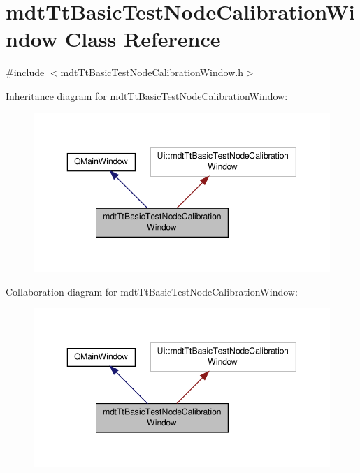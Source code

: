 \hypertarget{classmdt_tt_basic_test_node_calibration_window}{\section{mdt\-Tt\-Basic\-Test\-Node\-Calibration\-Window Class Reference}
\label{classmdt_tt_basic_test_node_calibration_window}
}


{\ttfamily \#include $<$mdt\-Tt\-Basic\-Test\-Node\-Calibration\-Window.\-h$>$}



Inheritance diagram for mdt\-Tt\-Basic\-Test\-Node\-Calibration\-Window\-:\nopagebreak
\begin{figure}[H]
\begin{center}
\leavevmode
\includegraphics[width=350pt]{classmdt_tt_basic_test_node_calibration_window__inherit__graph}
\end{center}
\end{figure}


Collaboration diagram for mdt\-Tt\-Basic\-Test\-Node\-Calibration\-Window\-:\nopagebreak
\begin{figure}[H]
\begin{center}
\leavevmode
\includegraphics[width=350pt]{classmdt_tt_basic_test_node_calibration_window__coll__graph}
\end{center}
\end{figure}
